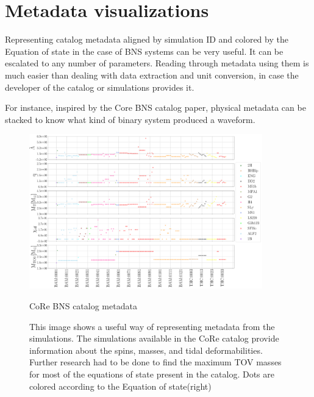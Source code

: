 \chapter{Metadata visualizations}\label{layer}

Representing catalog metadata aligned by simulation ID and colored by the Equation of state in the case of BNS systems can be very useful. It can be escalated to any number of parameters. Reading through metadata using them is much easier than dealing with data extraction and unit conversion, in case the developer of the catalog or simulations provides it. 

For instance, inspired by the Core BNS catalog paper, physical metadata can be stacked to know what kind of binary system produced a waveform.


\begin{figure}[hbt!]
\begin{center}
\includegraphics[width=0.9\textwidth]{images/Data_analysis/results/CORE_cat.pdf} 
\captionsetup{width=0.8\textwidth}
\caption{CoRe BNS catalog metadata}
\caption*{This image shows a useful way of representing metadata from the simulations. The simulations available in the CoRe catalog\cite{Dietrich:2018phi} provide information about the spins, masses, and tidal deformabilities. Further research had to be done to find the maximum TOV masses for most of the equations of state present in the catalog. Dots are colored according to the Equation of state(right)}
\end{center}
\label{corecat}
\end{figure}


\FloatBarrier


